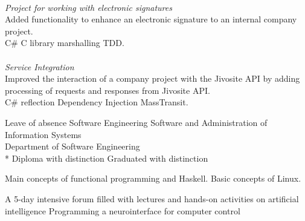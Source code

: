 \documentclass[
	a4paper,
]{fortysecondscv}
\begin{document}
\begin{cvtable}[1.5]

	{\\ \emph{Project for working with electronic signatures} \\
    Added functionality to enhance an electronic signature to an internal company project.
    \\ \colorbox{cvsidecolor}{C\#} 
    \colorbox{cvsidecolor}{C library} \colorbox{cvsidecolor}{marshalling}
    \colorbox{cvsidecolor}{TDD}. \\ \\
     \emph{Service Integration} \\
     Improved the interaction of a company project with the Jivosite API by adding processing of requests and responses from Jivosite API. 
     \\ \colorbox{cvsidecolor}{C\#} 
     \colorbox{cvsidecolor}{reflection} \colorbox{cvsidecolor}{Dependency Injection} \colorbox{cvsidecolor}{MassTransit}.
    }

\end{cvtable}



\begin{cvtable}[1.5]
	{Leave of absence}
	{ Software Engineering }
	{Software and Administration of Information Systems
		\\ Department of Software Engineering \\
	  * Diploma with distinction
	}
	{ Graduated with distinction}
\end{cvtable}

\begin{cvtable}[1.5]
	{Main concepts of functional programming and Haskell.}
	{Basic concepts of Linux.}
\end{cvtable}

\begin{cvtable}[1.5]
	{A 5-day intensive forum filled with lectures and hands-on activities on artificial intelligence}
	{ Programming a neurointerface for computer control }
\end{cvtable}
\end{document}
